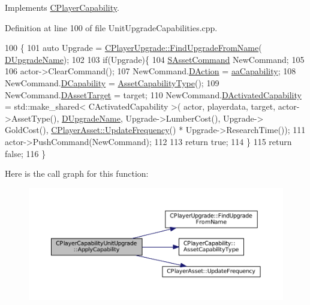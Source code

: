 Implements \hyperlink{classCPlayerCapability_a2ca6fd7fbd9c0178f1cf1d049c63825f}{C\+Player\+Capability}.



Definition at line 100 of file Unit\+Upgrade\+Capabilities.\+cpp.


\begin{DoxyCode}
100                                                                                                            
                                                               \{
101     \textcolor{keyword}{auto} Upgrade = \hyperlink{classCPlayerUpgrade_af47a08aba3a1a5b2cefacef24065a82e}{CPlayerUpgrade::FindUpgradeFromName}(
      \hyperlink{classCPlayerCapabilityUnitUpgrade_a5de8bffd6935c699f431329ad4ee5eec}{DUpgradeName});
102     
103     \textcolor{keywordflow}{if}(Upgrade)\{
104         \hyperlink{structSAssetCommand}{SAssetCommand} NewCommand;
105         
106         actor->ClearCommand();
107         NewCommand.\hyperlink{structSAssetCommand_a8edd3b3d59a76d5514ba403bc8076a75}{DAction} = \hyperlink{GameDataTypes_8h_ab47668e651a3032cfb9c40ea2d60d670acf9fb164e8abd71c71f4a8c7fda360d4}{aaCapability};
108         NewCommand.\hyperlink{structSAssetCommand_a734ea7c6847457b437360f333f570ff9}{DCapability} = \hyperlink{classCPlayerCapability_a433bb196cd6ab6a932f1cac102b3aa98}{AssetCapabilityType}();
109         NewCommand.\hyperlink{structSAssetCommand_a3d9b43f6e59c386c48c41a65448a0c39}{DAssetTarget} = target;
110         NewCommand.\hyperlink{structSAssetCommand_ad8beda19520811cc70fe1eab16c774dd}{DActivatedCapability} = std::make\_shared< CActivatedCapability >(
      actor, playerdata, target, actor->AssetType(), \hyperlink{classCPlayerCapabilityUnitUpgrade_a5de8bffd6935c699f431329ad4ee5eec}{DUpgradeName}, Upgrade->LumberCost(), Upgrade->
      GoldCost(), \hyperlink{classCPlayerAsset_a0aff85b9552967a42f4f3f42cb59c19f}{CPlayerAsset::UpdateFrequency}() * Upgrade->ResearchTime());
111         actor->PushCommand(NewCommand);
112         
113         \textcolor{keywordflow}{return} \textcolor{keyword}{true};
114     \}
115     \textcolor{keywordflow}{return} \textcolor{keyword}{false};
116 \}
\end{DoxyCode}
Here is the call graph for this function\+:\nopagebreak
\begin{figure}[H]
\begin{center}
\leavevmode
\includegraphics[width=350pt]{classCPlayerCapabilityUnitUpgrade_a8cc6fee17dd178fd798e36c3d5301e9d_cgraph}
\end{center}
\end{figure}
